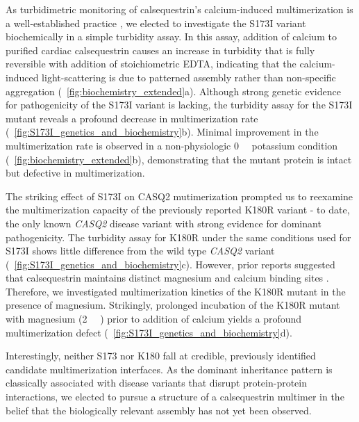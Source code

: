 As turbidimetric monitoring of calsequestrin's calcium-induced multimerization is a well-established practice \supercite{Bal2010-vf,Bal2011-tv}, we elected to investigate the S173I variant biochemically in a simple turbidity assay. In this assay, addition of calcium to purified cardiac calsequestrin causes an increase in turbidity that is fully reversible with addition of stoichiometric EDTA, indicating that the calcium-induced light-scattering is due to patterned assembly rather than non-specific aggregation (\extendeddatafigure~\ref{fig:biochemistry_extended}a). Although strong genetic evidence for pathogenicity of the S173I variant is lacking, the turbidity assay for the S173I mutant reveals a profound decrease in multimerization rate (\maintextfigure~\ref{fig:S173I_genetics_and_biochemistry}b). Minimal improvement in the multimerization rate is observed in a non-physiologic \SI{0}{\milli\Molar} potassium condition (\extendeddatafigure~\ref{fig:biochemistry_extended}b), demonstrating that the mutant protein is intact but defective in multimerization.

The striking effect of S173I on CASQ2 mutimerization prompted us to reexamine the multimerization capacity of the previously reported K180R variant - to date, the only known \textit{CASQ2} disease variant with strong evidence for dominant pathogenicity. The turbidity assay for K180R under the same conditions used for S173I shows little difference from the wild type \textit{CASQ2} variant (\maintextfigure~\ref{fig:S173I_genetics_and_biochemistry}c). However, prior reports suggested that calsequestrin maintains distinct magnesium and calcium binding sites \supercite{Krause1991-le}. Therefore, we investigated multimerization kinetics of the K180R mutant in the presence of magnesium. Strikingly, prolonged incubation of the K180R mutant with magnesium (\SI{2}{\milli\Molar} ) prior to addition of calcium yields a profound multimerization defect (\maintextfigure~\ref{fig:S173I_genetics_and_biochemistry}d). 

Interestingly, neither S173 nor K180 fall at credible, previously identified candidate multimerization interfaces. As the dominant inheritance pattern is classically associated with disease variants that disrupt protein-protein interactions, we elected to pursue a structure of a calsequestrin multimer in the belief that the biologically relevant assembly has not yet been observed. %

